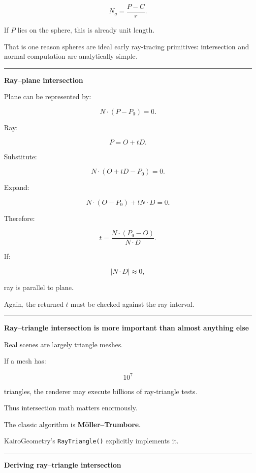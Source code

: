 \[
\boxed{
N_g=
\frac{P-C}{r}.
}
\]

If \(P\) lies on the sphere, this is already unit length.

That is one reason spheres are ideal early ray-tracing primitives: intersection and normal computation are analytically simple.

\begin{center}\rule{0.5\linewidth}{0.5pt}\end{center}

\textbf{Ray--plane intersection}

Plane can be represented by:

\[
N\cdot(P-P_0)=0.
\]

Ray:

\[
P=O+tD.
\]

Substitute:

\[
N\cdot(O+tD-P_0)=0.
\]

Expand:

\[
N\cdot(O-P_0)+tN\cdot D=0.
\]

Therefore:

\[
\boxed{
t=
\frac{
N\cdot(P_0-O)
}{
N\cdot D
}.
}
\]

If:

\[
|N\cdot D|\approx0,
\]

ray is parallel to plane.

Again, the returned \(t\) must be checked against the ray interval.

\begin{center}\rule{0.5\linewidth}{0.5pt}\end{center}

\textbf{Ray--triangle intersection is more important than almost anything else}

Real scenes are largely triangle meshes.

If a mesh has:

\[
10^7
\]

triangles, the renderer may execute billions of ray-triangle tests.

Thus intersection math matters enormously.

The classic algorithm is \textbf{Möller--Trumbore}.

KairoGeometry's \texttt{RayTriangle()} explicitly implements it.

\begin{center}\rule{0.5\linewidth}{0.5pt}\end{center}

\textbf{Deriving ray--triangle intersection}

